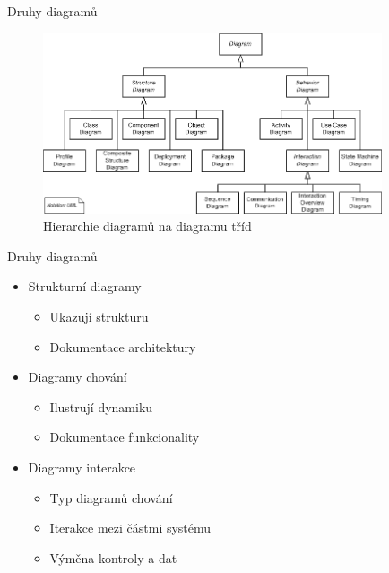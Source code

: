 
\begin{frame}{Druhy diagramů}

\begin{figure}
	\includegraphics[width=100mm]{img/diagramy.png}
	\caption{Hierarchie diagramů na diagramu tříd}
\end{figure}
	
\end{frame}


\begin{frame}{Druhy diagramů}

\begin{itemize}
	\item<+-> Strukturní diagramy
	\onslide<+->
	\begin{itemize}
		\item Ukazují strukturu
		\item Dokumentace architektury
	\end{itemize}
	
	\item<+-> Diagramy chování
	\onslide<+->
	\begin{itemize}
		\item Ilustrují dynamiku
		\item Dokumentace funkcionality
	\end{itemize}

	\item<+-> Diagramy interakce
	\onslide<+->
	\begin{itemize}
		\item Typ diagramů chování
		\item Iterakce mezi částmi systému
		\item Výměna kontroly a dat
	\end{itemize}

\end{itemize}
	
\end{frame}


